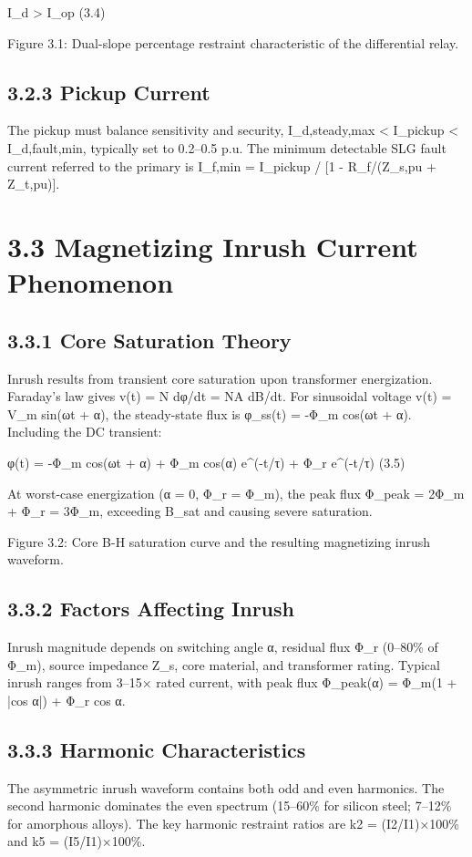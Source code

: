 I\_d > I\_op	(3.4)

Figure 3.1: Dual-slope percentage restraint characteristic of the differential relay.


\subsection{3.2.3  Pickup Current}
The pickup must balance sensitivity and security, I\_d,steady,max < I\_pickup < I\_d,fault,min, typically set to 0.2--0.5 p.u. The minimum detectable SLG fault current referred to the primary is I\_f,min = I\_pickup / [1 - R\_f/(Z\_s,pu + Z\_t,pu)].


\section{3.3  Magnetizing Inrush Current Phenomenon}

\subsection{3.3.1  Core Saturation Theory}
Inrush results from transient core saturation upon transformer energization. Faraday's law gives v(t) = N dφ/dt = NA dB/dt. For sinusoidal voltage v(t) = V\_m sin(ωt + α), the steady-state flux is φ\_ss(t) = -Φ\_m cos(ωt + α). Including the DC transient:

φ(t) = -Φ\_m cos(ωt + α) + Φ\_m cos(α) e^(-t/τ) + Φ\_r e^(-t/τ)	(3.5)

At worst-case energization (α = 0, Φ\_r = Φ\_m), the peak flux Φ\_peak = 2Φ\_m + Φ\_r = 3Φ\_m, exceeding B\_sat and causing severe saturation.

Figure 3.2: Core B-H saturation curve and the resulting magnetizing inrush waveform.


\subsection{3.3.2  Factors Affecting Inrush}
Inrush magnitude depends on switching angle α, residual flux Φ\_r (0--80\% of Φ\_m), source impedance Z\_s, core material, and transformer rating. Typical inrush ranges from 3--15× rated current, with peak flux Φ\_peak(α) = Φ\_m(1 + |cos α|) + Φ\_r cos α.


\subsection{3.3.3  Harmonic Characteristics}
The asymmetric inrush waveform contains both odd and even harmonics. The second harmonic dominates the even spectrum (15--60\% for silicon steel; 7--12\% for amorphous alloys). The key harmonic restraint ratios are k2 = (I2/I1)×100\% and k5 = (I5/I1)×100\%.


